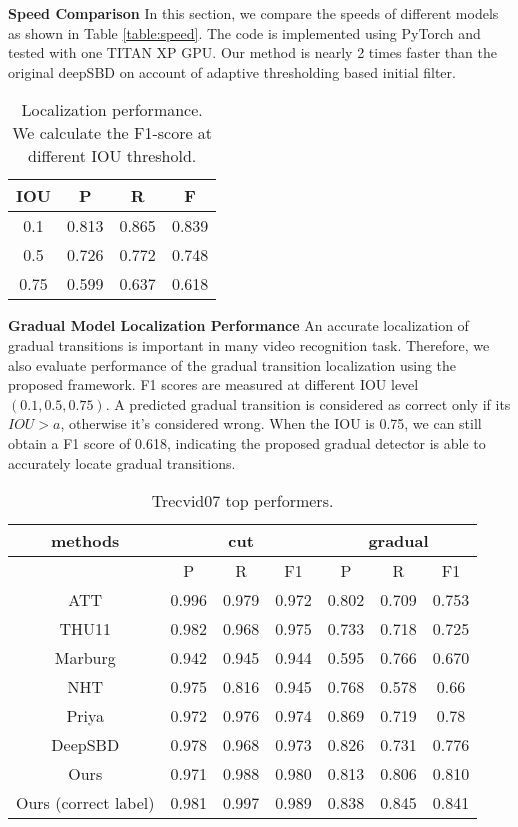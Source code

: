 \documentclass[runningheads]{llncs}
\begin{document}
\textbf{Speed Comparison}
In this section, we compare the speeds of different models as shown in Table \ref{table:speed}. The code is implemented using PyTorch and tested with one TITAN XP GPU. Our method is nearly 2 times faster than the original deepSBD on account of adaptive thresholding based initial filter.

\begin{table}
\centering
\begin{tabular} {c|c|c|c}
\hline IOU&P&R&F\\
\hline 0.1&0.813&0.865&0.839\\ 
\hline 0.5&0.726&0.772&0.748\\ 
\hline 0.75&0.599&0.637&0.618\\ 
\hline
\end{tabular}
\caption[localization]{Localization performance. We calculate the F1-score at different IOU threshold.}\label{table:3}
\end{table}
\vspace{-1em}
\textbf{Gradual Model Localization Performance} An accurate localization of gradual transitions is important in many video recognition task. Therefore, we also evaluate performance of the gradual transition localization using the proposed framework. F1 scores are measured at different IOU level \((0.1,0.5,0.75)\). A predicted gradual transition is considered as correct only if its \(IOU>a\), otherwise it's considered wrong. When the IOU is 0.75, we can still obtain a F1 score of 0.618, indicating the proposed gradual detector is able to accurately locate gradual transitions.  

\begin{table}
\centering
\begin{tabular} {c|c|c|c|c|c|c}
\hline \multicolumn{1}{c|}{methods}&\multicolumn{3}{|c|}{cut}&\multicolumn{3}{|c}{gradual}\\
\hline &P&R&F1&P&R&F1\\
\hline ATT\cite{liu2007t}&0.996&0.979&0.972&0.802&0.709&0.753\\
\hline THU11\cite{yuan2007formal}&0.982&0.968&0.975&0.733&0.718&0.725\\
\hline Marburg\cite{muhling2007university}&0.942&0.945&0.944&0.595&0.766&0.670\\
\hline NHT\cite{kawai2007shot}&0.975&0.816&0.945&0.768&0.578&0.66\\
\hline Priya\cite{domnic2014walsh}&0.972&0.976&0.974&0.869&0.719&0.78\\
\hline DeepSBD\cite{hassanien2017large}&0.978&0.968&0.973&0.826&0.731&0.776\\
\hline Ours&0.971&0.988&0.980&0.813&0.806&0.810\\
\hline Ours (correct label)&0.981&0.997&0.989&0.838&0.845&0.841\\
\hline 
\end{tabular}
\caption[Trecvid comparison]{Trecvid07 top performers.}\label{table:4}
\end{table}
\vspace{-3em}
\end{document}
